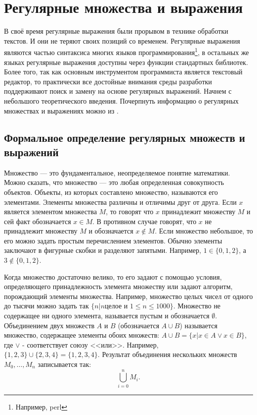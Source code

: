\chapter{Регулярные множества и выражения}

В своё время регулярные выражения были прорывом в технике обработки текстов. И они не теряют своих позиций со временем. Регулярные выражения являются частью синтаксиса многих языков программирования\footnote{Например, perl}, в остальных же языках регулярные выражения доступны через функции стандартных библиотек. Более того, так как основным инструментом программиста является текстовый редактор, то практически все достойные внимания среды разработки поддерживают поиск и замену на основе регулярных выражений. Начнем с небольшого теоретического введения. Почерпнуть информацию о регулярных множествах и выражениях можно из \cite{bib:serebryakov:programminglang}.


\section{Формальное определение регулярных множеств и выражений}
Множество --- это фундаментальное, неопределяемое понятие математики. Можно сказать, что множество --- это любая определенная совокупность объектов. Объекты, из которых составлено множество, называются его элементами. Элементы множества различны и отличимы друг от друга. Если $x$ является элементом множества $M$, то говорят что $x$ принадлежит множеству $M$ и сей факт обозначается $x\in M$. В противном случае говорят, что $x$ не принадлежит множеству $M$ и обозначается $x\not\in M$. Если множество небольшое, то его можно задать простым перечислением элементов. Обычно элементы заключают в фигурные скобки и разделяют запятыми. Например, $1\in\{0,1,2\}$, а $3\not\in\{0,1,2\}$. 

Когда множество достаточно велико, то его задают с помощью условия, определяющего принадлежность элемента множеству или задают алгоритм, порождающий элементы множества. Например, множество целых чисел от одного до тысячи можно задать так $\{n|n\text{целое и\ } 1\leq n\leq 1000\}$. Множество не содержащее ни одного элемента, называется пустым и обозначается $\emptyset$. Объединением двух множеств $A$ и $B$ (обозначается $A\cup B$) называется множество, содержащее элементы обоих множеств: $A\cup B=\{x|x\in A\lor x\in B\}$, где $\lor$ - соответствует союзу <<или>>. Например, $\{1,2,3\}\cup\{2,3,4\}=\{1,2,3,4\}$. Результат объединения нескольких множеств $M_0,\ldots,M_n$ записывается так:
\[\bigcup_{i=0}^{n}M_i.\]

